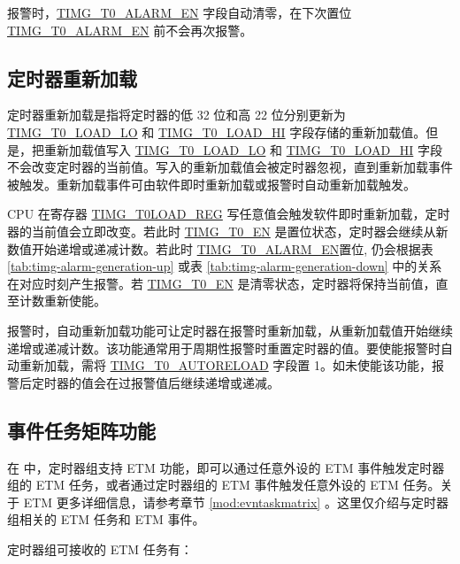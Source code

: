 \documentclass[main\_\_CN.tex]{subfiles}
\begin{document}
报警时，\hyperref[fielddesc:TIMGTXALARMEN]{TIMG\_T0\_ALARM\_EN} 字段自动清零，在下次置位 \hyperref[fielddesc:TIMGTXALARMEN]{TIMG\_T0\_ALARM\_EN} 前不会再次报警。

\subsection{定时器重新加载} \label{sec:timg-func-descr-reload}

定时器重新加载是指将定时器的低 32 位和高 22 位分别更新为 \hyperref[fielddesc:TIMGTXLOADLO]{TIMG\_T0\_LOAD\_LO} 和 \hyperref[fielddesc:TIMGTXLOADHI]{TIMG\_T0\_LOAD\_HI} 字段存储的重新加载值。但是，把重新加载值写入 \hyperref[fielddesc:TIMGTXLOADLO]{TIMG\_T0\_LOAD\_LO} 和 \hyperref[fielddesc:TIMGTXLOADHI]{TIMG\_T0\_LOAD\_HI} 字段不会改变定时器的当前值。写入的重新加载值会被定时器忽视，直到重新加载事件被触发。重新加载事件可由软件即时重新加载或报警时自动重新加载触发。

CPU 在寄存器 \hyperref[regdesc:TIMGTXLOADREG]{TIMG\_T0LOAD\_REG} 写任意值会触发软件即时重新加载，定时器的当前值会立即改变。若此时 \hyperref[fielddesc:TIMGTXEN]{TIMG\_T0\_EN} 是置位状态，定时器会继续从新数值开始递增或递减计数。若此时 \hyperref[fielddesc:TIMGTXALARMEN]{TIMG\_T0\_ALARM\_EN}置位, 仍会根据表 \ref{tab:timg-alarm-generation-up} 或表 \ref{tab:timg-alarm-generation-down} 中的关系在对应时刻产生报警。若 \hyperref[fielddesc:TIMGTXEN]{TIMG\_T0\_EN} 是清零状态，定时器将保持当前值，直至计数重新使能。

报警时，自动重新加载功能可让定时器在报警时重新加载，从重新加载值开始继续递增或递减计数。该功能通常用于周期性报警时重置定时器的值。要使能报警时自动重新加载，需将 \hyperref[fielddesc:TIMGTXAUTORELOAD]{TIMG\_T0\_AUTORELOAD} 字段置 1。如未使能该功能，报警后定时器的值会在过报警值后继续递增或递减。

\subsection{事件任务矩阵功能} \label{sec:timg-etm-func}

在 \chipname{} 中，定时器组支持 ETM 功能，即可以通过任意外设的 ETM 事件触发定时器组的 ETM 任务，或者通过定时器组的 ETM 事件触发任意外设的 ETM 任务。关于 ETM 更多详细信息，请参考章节 \ref{mod:evntaskmatrix} 。这里仅介绍与定时器组相关的 ETM 任务和 ETM 事件。

定时器组可接收的 ETM 任务有：
\end{document}

